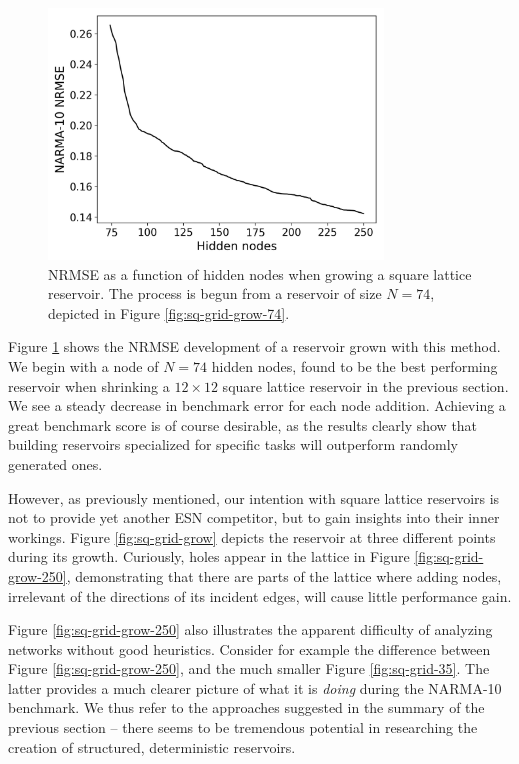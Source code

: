 \begin{figure}[htb]
  \centering
  \includegraphics[width=3.5in]{figures/grow-performance.png}
  \caption{
    NRMSE as a function of hidden nodes when growing a square lattice
reservoir. The process is begun from a reservoir of size $N = 74$, depicted in
Figure \protect\ref{fig:sq-grid-grow-74}.
  }
  \label{fig:sq-grow-performance}
\end{figure}

Figure \ref{fig:sq-grow-performance} shows the NRMSE development of a reservoir
grown with this method. We begin with a node of $N = 74$ hidden nodes, found to
be the best performing reservoir when shrinking a $12 \times 12$ square lattice
reservoir in the previous section. We see a steady decrease in benchmark error
for each node addition. Achieving a great benchmark score is of course
desirable, as the results clearly show that building reservoirs specialized for
specific tasks will outperform randomly generated ones.

However, as previously mentioned, our intention with square lattice reservoirs
is not to provide yet another ESN competitor, but to gain insights into their
inner workings. Figure \ref{fig:sq-grid-grow} depicts the reservoir at three
different points during its growth. Curiously, holes appear in the lattice in
Figure \ref{fig:sq-grid-grow-250}, demonstrating that there are parts of the
lattice where adding nodes, irrelevant of the directions of its incident edges,
will cause little performance gain.

Figure \ref{fig:sq-grid-grow-250} also illustrates the apparent difficulty of
analyzing networks without good heuristics. Consider for example the difference
between Figure \ref{fig:sq-grid-grow-250}, and the much smaller Figure
\ref{fig:sq-grid-35}. The latter provides a much clearer picture of what it is
\textit{doing} during the NARMA-10 benchmark. We thus refer to the approaches
suggested in the summary of the previous section -- there seems to be tremendous
potential in researching the creation of structured, deterministic reservoirs.

